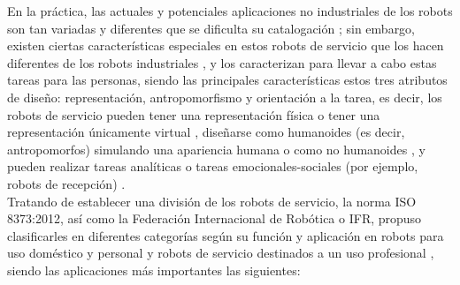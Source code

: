 En la práctica, las actuales y potenciales aplicaciones no industriales de los robots son tan variadas y diferentes que se dificulta su catalogación \cite{Barrientos02}; sin embargo, existen ciertas características especiales en estos robots de servicio %
que los hacen diferentes de los robots industriales \cite{Aracil08}, y los caracterizan para llevar a cabo estas tareas para las personas, siendo las principales características estos tres atributos de diseño: representación, antropomorfismo y orientación a la tarea, es decir, los robots de servicio pueden tener una representación física %
o tener una representación únicamente virtual %
, diseñarse como humanoides (es decir, antropomorfos) simulando una apariencia humana o como no humanoides %
, y pueden realizar tareas analíticas %
o tareas emocionales-sociales (por ejemplo, robots de recepción) \cite{Wirtz18}.\\


Tratando de establecer una división de los robots de servicio, la norma ISO 8373:2012, así como la Federación Internacional de Robótica o IFR, propuso clasificarles en diferentes categorías según su función y aplicación en robots para uso doméstico y personal y robots de servicio destinados a un uso profesional \cite{Gonzalez21}, siendo las aplicaciones más importantes las siguientes:

